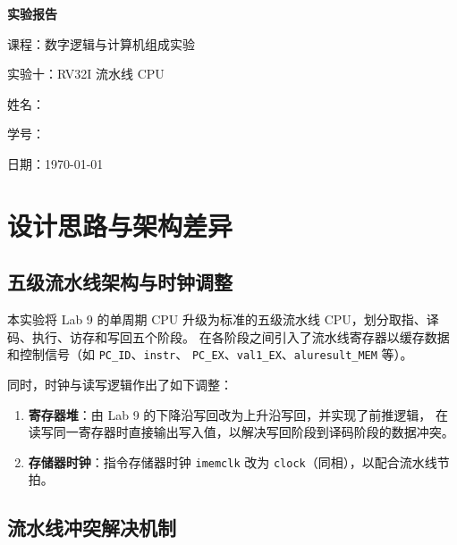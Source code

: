 \documentclass[12pt, a4paper]{ctexart}
\begin{document}
\begin{titlepage}
    \centering
    \vspace*{5cm}
    {\Huge\bfseries 实验报告\par}
    \vspace{2cm}
    {\Large 课程：数字逻辑与计算机组成实验\par}
    \vspace{1cm}
    {\Large 实验十：RV32I 流水线 CPU\par}
    \vspace{4cm}
    {\large 姓名：\underline{}\par}
    \vspace{1cm}
    {\large 学号：\underline{}\par}
    \vspace{1cm}
    {\large 日期：\today\par}
\end{titlepage}

\tableofcontents
\newpage
\section{设计思路与架构差异}

\subsection{五级流水线架构与时钟调整}

本实验将 Lab 9 的单周期 CPU 升级为标准的五级流水线 CPU，划分取指、译码、执行、访存和写回五个阶段。
在各阶段之间引入了流水线寄存器以缓存数据和控制信号（如 \texttt{PC\_ID}、\texttt{instr}、
\texttt{PC\_EX}、\texttt{val1\_EX}、\texttt{aluresult\_MEM} 等）。

同时，时钟与读写逻辑作出了如下调整：
\begin{enumerate}
    \item \textbf{寄存器堆}：由 Lab 9 的下降沿写回改为上升沿写回，并实现了前推逻辑，
    在读写同一寄存器时直接输出写入值，以解决写回阶段到译码阶段的数据冲突。
    \item \textbf{存储器时钟}：指令存储器时钟 \texttt{imemclk} 改为 \texttt{clock}（同相），以配合流水线节拍。
\end{enumerate}

\subsection{流水线冲突解决机制}
\end{document}
